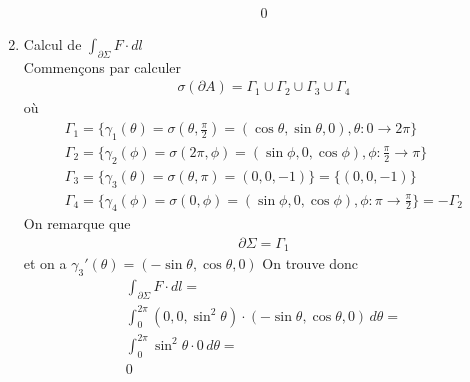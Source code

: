 \begin{myExample}
\begin{enumerate}
\begin{eqnarray*}
				\\
				0
			\end{eqnarray*}
		\item
			Calcul de $\int_{\partial\Sigma}F\cdot dl$
			\\
			Commençons par calculer
			\begin{eqnarray*}
				\sigma(\partial A)=\Gamma_1\cup\Gamma_2\cup\Gamma_3\cup\Gamma_4
			\end{eqnarray*}
			où
			\begin{eqnarray*}
				\Gamma_1=\{\gamma_1(\theta)=\sigma(\theta,\frac{\pi}{2})=(\cos\theta,\sin\theta,0),\theta:0\rightarrow 2\pi\}
				\\
				\Gamma_2=\{\gamma_2(\phi)=\sigma(2\pi,\phi)=(\sin\phi,0,\cos\phi),\phi:\frac{\pi}{2}\rightarrow \pi\}
				\\
				\Gamma_3=\{\gamma_3(\theta)=\sigma(\theta,\pi)=(0,0,-1)\}=\{(0,0,-1)\}
				\\
				\Gamma_4=\{\gamma_4(\phi)=\sigma(0,\phi)=(\sin\phi,0,\cos\phi),\phi:\pi \rightarrow \frac{\pi}{2}\}=-\Gamma_2
			\end{eqnarray*}
			On remarque que
			\begin{eqnarray*}
				\partial\Sigma=\Gamma_1
			\end{eqnarray*}
			et on a $\gamma_3'(\theta)=(-\sin\theta,\cos\theta,0)$
			On trouve donc
			\begin{eqnarray*}
				\int_{\partial\Sigma}F\cdot dl=
				\\
				\int_{0}^{2\pi}(0,0,\sin^2\theta)\cdot(-\sin\theta,\cos\theta,0)\,d\theta=
				\\
				\int_{0}^{2\pi}\sin^2\theta\cdot 0\,d\theta=
				\\
				0
			\end{eqnarray*}
	\end{enumerate}
\end{myExample}